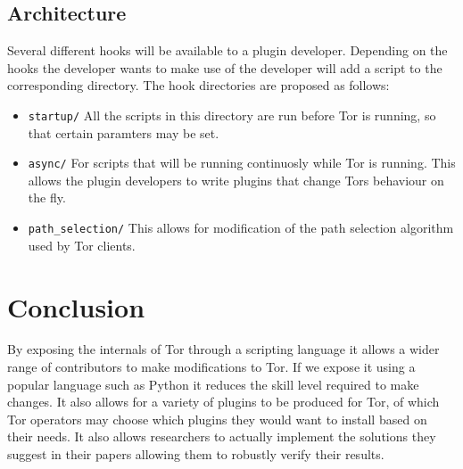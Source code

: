 \documentclass[9pt,technote]{IEEEtran}
\begin{document}
\subsection{Architecture}
Several different hooks will be available to a plugin developer. Depending on
the hooks the developer wants to make use of the developer will add a script to
the corresponding directory. The hook directories are proposed as follows:
\begin{itemize}
\item \texttt{startup/} All the scripts in this directory are run before Tor is
	running, so that certain paramters may be set.
\item \texttt{async/} For scripts that will be running continuosly while Tor is
	running. This allows the plugin developers to write plugins that change
	Tors behaviour on the fly.
\item \texttt{path\_selection/} This allows for modification of the path
	selection algorithm used by Tor clients.
\end{itemize}



\section{Conclusion}
By exposing the internals of Tor through a scripting language it allows a wider
range of contributors to make modifications to Tor. If we expose it using a
popular language such as Python it reduces the skill level required to make
changes. It also allows for a variety of plugins to be produced for Tor, of
which Tor operators may choose which plugins they would want to install based
on their needs. It also allows researchers to actually implement the solutions
they suggest in their papers allowing them to robustly verify their results.



\end{document}
